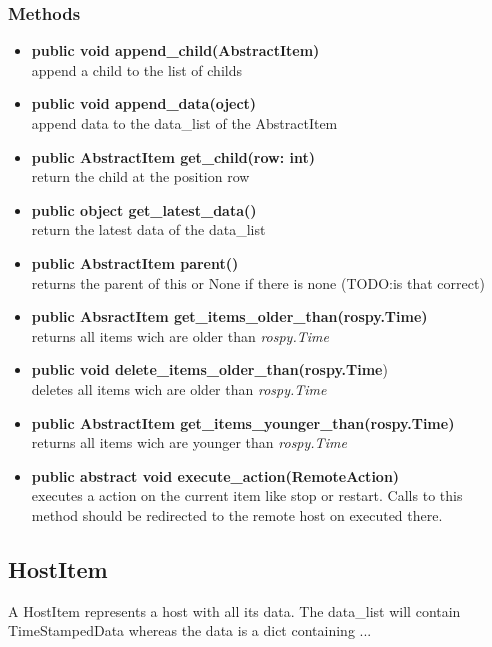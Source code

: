 \subsubsection{Methods}
\begin{itemize}
   \item \textbf{public void append\_child(AbstractItem)}\\ 
   append a child to the list of childs
  \item \textbf{public void append\_data(oject)}\\ 
  append data to the data\_list of the AbstractItem
  \item \textbf{public AbstractItem get\_child(row: int)}\\ 
  return the child at the position row
  \item \textbf{public object get\_latest\_data()}\\ 
  return the latest data of the data\_list
  \item \textbf{public AbstractItem parent()}\\ 
  returns the parent of this or None if there is none (TODO:is that correct)
  \item \textbf{public AbsractItem get\_items\_older\_than(rospy.Time)}\\
  returns all items wich are older than \textit{rospy.Time}
  \item \textbf{public void delete\_items\_older\_than(rospy.Time})\\
  deletes all items wich are older than \textit{rospy.Time}
  \item \textbf{public AbstractItem get\_items\_younger\_than(rospy.Time)}\\
  returns all items wich are younger than \textit{rospy.Time}
  \item \textbf{public abstract void execute\_action(RemoteAction)}\\ 
  executes a action on the current item like stop or restart. Calls to this
  method should be redirected to the remote host on executed there.
\end{itemize}

\subsection{HostItem}
A HostItem represents a host with all its data.
The data\_list will contain TimeStampedData whereas the data is a dict
containing ...
